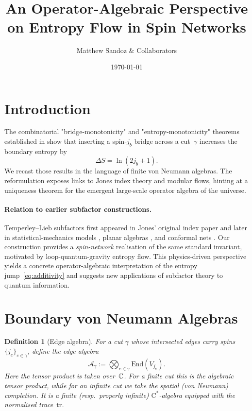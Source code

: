 \documentclass[11pt]{article}
\newtheorem{definition}{Definition}[section]
\begin{document}
\title{An Operator-Algebraic Perspective on Entropy Flow in Spin Networks}
\author{\small Matthew Sandoz \& Collaborators}
\date{\today}
\maketitle

\section{Introduction}
The combinatorial "bridge-monotonicity" and "entropy-monotonicity" theorems
established in \cite{BridgeMono,EntropyMono}
show that inserting a spin-$j_b$ bridge across a cut~$\gamma$ increases the
boundary entropy by
\[
  \Delta S = \ln(2j_b+1).
\]
We recast those results in the language of finite von Neumann algebras.  
The reformulation exposes links to Jones index theory and modular flows, hinting
at a uniqueness theorem for the emergent large-scale operator algebra of the
universe.

\paragraph{Relation to earlier subfactor constructions.}
Temperley--Lieb subfactors first appeared in Jones’ original index
paper \cite{Jones1983} and later in statistical-mechanics models
\cite{KauffmanLins}, planar algebras \cite{JonesPA}, and conformal nets
\cite{KawahigashiLongo}.  
Our construction provides a \emph{spin-network} realisation of the same
standard invariant, motivated by loop-quantum-gravity entropy flow.
This physics‐driven perspective yields a concrete operator-algebraic
interpretation of the entropy jump~\eqref{eq:additivity} and suggests
new applications of subfactor theory to quantum information.


\section{Boundary von Neumann Algebras}

\begin{definition}[Edge algebra]
For a cut $\gamma$ whose intersected edges carry spins
$\{j_e\}_{e\in\gamma}$, define the \emph{edge algebra}
\[
  \mathcal A_{\gamma}
  := \bigotimes_{e\in\gamma} \mathrm{End}(V_{j_e}).
\]
Here the tensor product is taken over~$\Bbb C$.
For a finite cut this is the algebraic tensor product,
while for an infinite cut we take the spatial (von Neumann) completion.
It is a finite (resp.\ properly infinite) $\mathrm C^\ast$-algebra
equipped with the normalised trace~$\mathrm{tr}$.
\end{definition}
\end{document}
